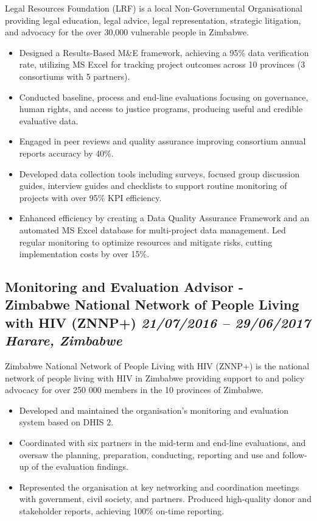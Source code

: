 \documentclass[
  10pt,
]{article}
\providecommand{\tightlist}{%
  \setlength{\itemsep}{0pt}\setlength{\parskip}{0pt}}
\begin{document}
Legal Resources Foundation (LRF) is a local Non-Governmental Organisational providing legal education, legal advice, legal representation, strategic litigation, and advocacy for the over 30,000 vulnerable people in Zimbabwe.

\begin{itemize}
\tightlist
\item
Designed a Results-Based M\&E framework, achieving a 95\% data verification rate, utilizing MS Excel for tracking project outcomes across 10 provinces (3 consortiums with 5 partners).
\item
Conducted baseline, process and end-line evaluations focusing on governance, human rights, and access to justice programs, producing useful and credible evaluative data.
\item
Engaged in peer reviews and quality assurance improving consortium annual reports accuracy by 40\%.
\item
Developed data collection tools including surveys, focused group discussion guides, interview guides and checklists to support routine monitoring of projects with over 95\% KPI efficiency.
\item
Enhanced efficiency by creating a Data Quality Assurance Framework and an automated MS Excel database for multi-project data management. Led regular monitoring to optimize resources and mitigate risks, cutting implementation costs by over 15\%.
\end{itemize}

\subsection{\texorpdfstring{Monitoring and Evaluation Advisor - Zimbabwe
National Network of People Living with HIV (ZNNP+) \emph{21/07/2016 --
29/06/2017} \textbar{} \emph{Harare, Zimbabwe}}{Monitoring and Evaluation Advisor - Zimbabwe National Network of People Living with HIV (ZNNP+) 21/07/2016 -- 29/06/2017 \textbar{} Harare, Zimbabwe}}\label{monitoring-and-evaluation-advisor---zimbabwe-national-network-of-people-living-with-hiv-znnp-21072016-29062017-harare-zimbabwe}

Zimbabwe National Network of People Living with HIV (ZNNP+) is the national network of people living with HIV in Zimbabwe providing support to and policy advocacy for over 250 000 members in the 10 provinces of Zimbabwe.

\begin{itemize}
\tightlist
\item
Developed and maintained the organisation's monitoring and evaluation system based on DHIS 2.
\item
Coordinated with six partners in the mid-term and end-line evaluations, and oversaw the planning, preparation, conducting, reporting and use and follow-up of the evaluation findings.
\item
Represented the organisation at key networking and coordination meetings with government, civil society, and partners. Produced high-quality donor and stakeholder reports, achieving 100\% on-time reporting.
\end{itemize}
\end{document}
